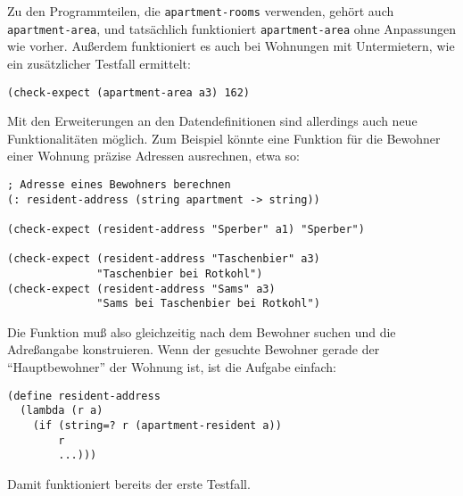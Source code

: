 Zu den Programmteilen, die \texttt{apartment-rooms} verwenden,
gehört auch \texttt{apartment-area}, und tatsächlich funktioniert
\texttt{apartment-area} ohne Anpassungen wie vorher.  Außerdem
funktioniert es auch bei Wohnungen mit Untermietern, wie ein
zusätzlicher Testfall ermittelt:
%
\begin{verbatim}
(check-expect (apartment-area a3) 162)
\end{verbatim}
%
Mit den Erweiterungen an den Datendefinitionen sind allerdings auch
neue Funktionalitäten möglich.  Zum Beispiel könnte eine Funktion für
die Bewohner einer Wohnung präzise Adressen ausrechnen, etwa so:
%
\begin{verbatim}
; Adresse eines Bewohners berechnen
(: resident-address (string apartment -> string))

(check-expect (resident-address "Sperber" a1) "Sperber")

(check-expect (resident-address "Taschenbier" a3)
              "Taschenbier bei Rotkohl") 
(check-expect (resident-address "Sams" a3)
              "Sams bei Taschenbier bei Rotkohl")
\end{verbatim}
%
Die Funktion muß also gleichzeitig nach dem Bewohner suchen und die
Adreßangabe konstruieren.  Wenn der gesuchte Bewohner gerade der
"`Hauptbewohner"' der Wohnung ist, ist die Aufgabe einfach:
%
\begin{verbatim}
(define resident-address
  (lambda (r a)
    (if (string=? r (apartment-resident a))
        r
        ...)))
\end{verbatim}
%
Damit funktioniert bereits der erste Testfall. 

